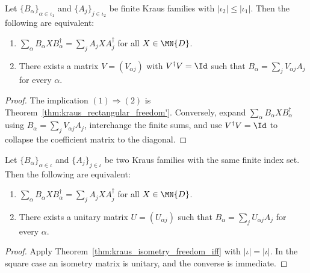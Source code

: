 \begin{theorem}
    \label{thm:kraus_isometry_freedom_iff}
    \leanok
    Let $\{B_\alpha\}_{\alpha \in \iota_1}$ and $\{A_j\}_{j \in \iota_2}$
    be finite Kraus families with $|\iota_2| \le |\iota_1|$.
    Then the following are equivalent:
    \begin{enumerate}
        \item $\sum_\alpha B_\alpha X B_\alpha^\dagger
                  = \sum_j A_j X A_j^\dagger$ for all $X \in \MN{D}$.
        \item There exists a matrix $V = (V_{\alpha j})$ with
              $V^\dagger V = \Id$ such that
              $B_\alpha = \sum_j V_{\alpha j} A_j$ for every $\alpha$.
    \end{enumerate}
\end{theorem}

\begin{proof}
    \leanok
    The implication $(1) \Rightarrow (2)$ is
    Theorem~\ref{thm:kraus_rectangular_freedom'}.
    Conversely, expand $\sum_\alpha B_\alpha X B_\alpha^\dagger$ using
    $B_\alpha = \sum_j V_{\alpha j} A_j$, interchange the finite sums,
    and use $V^\dagger V = \Id$ to collapse the coefficient matrix to the
    diagonal.
\end{proof}

\begin{theorem}
    \label{thm:kraus_unitary_freedom_iff}
    \leanok
    Let $\{B_\alpha\}_{\alpha \in \iota}$ and $\{A_j\}_{j \in \iota}$
    be two Kraus families with the same finite index set.
    Then the following are equivalent:
    \begin{enumerate}
        \item $\sum_\alpha B_\alpha X B_\alpha^\dagger
                  = \sum_j A_j X A_j^\dagger$ for all $X \in \MN{D}$.
        \item There exists a unitary matrix $U = (U_{\alpha j})$ such that
              $B_\alpha = \sum_j U_{\alpha j} A_j$ for every $\alpha$.
    \end{enumerate}
\end{theorem}

\begin{proof}
    \leanok
    Apply Theorem~\ref{thm:kraus_isometry_freedom_iff} with
    $|\iota| = |\iota|$.
    In the square case an isometry matrix is unitary, and the converse is
    immediate.
\end{proof}

